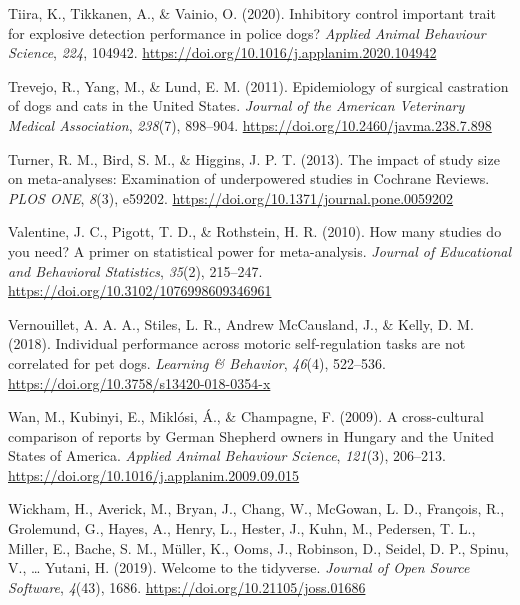 \documentclass[
  ,pub,floatsintext]{apa6}
\newlength{\cslhangindent}
\newlength{\cslentryspacingunit} %
\newenvironment{CSLReferences}[2] %
 {%
  \setlength{\parindent}{0pt}
  \ifodd #1
  \let\oldpar\par
  \def\par{\hangindent=\cslhangindent\oldpar}
  \fi
  \setlength{\parskip}{#2\cslentryspacingunit}
 }%
 {}
\begin{document}
\begin{CSLReferences}{1}{0}
\leavevmode{}%
Tiira, K., Tikkanen, A., \& Vainio, O. (2020). Inhibitory control \textendash{} important trait for explosive detection performance in police dogs? \emph{Applied Animal Behaviour Science}, \emph{224}, 104942. \url{https://doi.org/10.1016/j.applanim.2020.104942}

\leavevmode{}%
Trevejo, R., Yang, M., \& Lund, E. M. (2011). Epidemiology of surgical castration of dogs and cats in the {United States}. \emph{Journal of the American Veterinary Medical Association}, \emph{238}(7), 898--904. \url{https://doi.org/10.2460/javma.238.7.898}

\leavevmode{}%
Turner, R. M., Bird, S. M., \& Higgins, J. P. T. (2013). The impact of study size on meta-analyses: {Examination} of underpowered studies in {Cochrane Reviews}. \emph{PLOS ONE}, \emph{8}(3), e59202. \url{https://doi.org/10.1371/journal.pone.0059202}

\leavevmode{}%
Valentine, J. C., Pigott, T. D., \& Rothstein, H. R. (2010). How many studies do you need? {A} primer on statistical power for meta-analysis. \emph{Journal of Educational and Behavioral Statistics}, \emph{35}(2), 215--247. \url{https://doi.org/10.3102/1076998609346961}

\leavevmode{}%
Vernouillet, A. A. A., Stiles, L. R., Andrew McCausland, J., \& Kelly, D. M. (2018). Individual performance across motoric self-regulation tasks are not correlated for pet dogs. \emph{Learning \& Behavior}, \emph{46}(4), 522--536. \url{https://doi.org/10.3758/s13420-018-0354-x}

\leavevmode{}%
Wan, M., Kubinyi, E., Miklósi, Á., \& Champagne, F. (2009). A cross-cultural comparison of reports by {German Shepherd} owners in {Hungary} and the {United States} of {America}. \emph{Applied Animal Behaviour Science}, \emph{121}(3), 206--213. \url{https://doi.org/10.1016/j.applanim.2009.09.015}

\leavevmode{}%
Wickham, H., Averick, M., Bryan, J., Chang, W., McGowan, L. D., François, R., Grolemund, G., Hayes, A., Henry, L., Hester, J., Kuhn, M., Pedersen, T. L., Miller, E., Bache, S. M., Müller, K., Ooms, J., Robinson, D., Seidel, D. P., Spinu, V., \ldots{} Yutani, H. (2019). Welcome to the {tidyverse}. \emph{Journal of Open Source Software}, \emph{4}(43), 1686. \url{https://doi.org/10.21105/joss.01686}


\end{CSLReferences}
\end{document}
